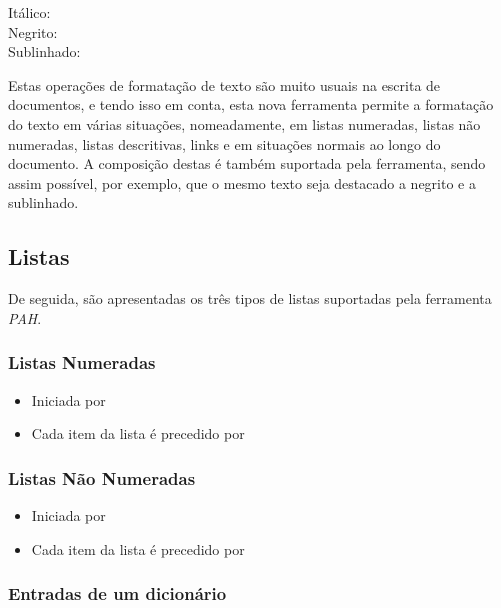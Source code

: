 \documentclass[11pt,a4paper]{article}
\begin{document}
\begin{description}
    \item[Itálico:] \verb@ %i{Texto em itálico} @
    \item[Negrito:] \verb@ %b{Texto em negrito} @
    \item[Sublinhado:] \verb@ %u{Textto sublinhado} @
\end{description}

Estas operações de formatação de texto são muito usuais na escrita de documentos, e tendo isso em conta, esta nova  ferramenta permite a formatação do texto em várias situações, nomeadamente, em listas numeradas, listas não numeradas, listas descritivas, links e em situações normais ao longo do documento. A composição destas é também suportada pela ferramenta, sendo assim possível, por exemplo, que o mesmo texto seja destacado a negrito e a sublinhado.  \\ 

\subsection{Listas} 
De seguida, são apresentadas os três tipos de listas suportadas pela ferramenta \textit{PAH}. \\  
 

\subsubsection{Listas Numeradas}


\begin{itemize}
    \item Iniciada por \verb@ %%ol% @ e finalizada por \verb@ %ol%% @;
    \item Cada item da lista é precedido por \verb@ %it @.
\end{itemize}



\subsubsection{Listas Não Numeradas}


\begin{itemize}
    \item Iniciada por \verb@ %%ul% @ e finalizada por \verb@ %ul%% @;
    \item Cada item da lista é precedido por \verb@ %it @.
\end{itemize}


\subsubsection{Entradas de um dicionário}
\end{document}
